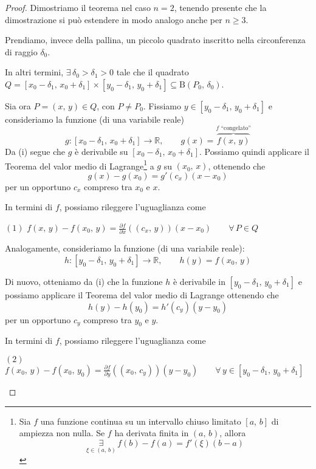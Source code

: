\begin{proof}
Dimostriamo il teorema nel caso $n=2$, tenendo presente che la dimostrazione si può estendere in modo analogo anche per $n \geq 3$.

Prendiamo, invece della pallina, un piccolo quadrato inscritto nella circonferenza di raggio $\delta_0$.
\begin{center}
\def\svgwidth{14cm}

\end{center}
In altri termini, $\exists \, \delta_0 > \delta_1 > 0$ tale che il quadrato $Q=[x_0-\delta_1,\,x_0+\delta_1] \times [y_0-\delta_1,\,y_0+\delta_1] \subseteq \mathrm{B}(P_0,\,\delta_0)$.

Sia ora $P=(x,\,y) \in Q$, con $P \neq P_0$. Fissiamo $y \in [y_0-\delta_1,\,y_0+\delta_1]$ e consideriamo la funzione (di una variabile reale)
$$g:[x_0-\delta_1,\,x_0+\delta_1] \rightarrow \mathbb{R}, \qquad g(x) = \overbrace{f(x,\,y)}^{f \text{ ``congelato''}}$$
Da (i) segue che $g$ è derivabile su $[x_0-\delta_1,\,x_0+\delta_1]$. Possiamo quindi applicare il Teorema del valor medio di Lagrange\footnote{
\cite{Greco2012} Sia $f$ una funzione continua su un intervallo chiuso limitato $[a,\,b]$ di ampiezza non nulla. Se $f$ ha derivata finita in $(a,\,b)$, allora
$$
\underset{{\xi \in (a,\,b)}}{\exists} \, f(b)-f(a) = f'(\xi)(b-a)
$$
} a $g$ su $(x_0,\,x)$, ottenendo che
$$g(x)-g(x_0) = g'(c_x)(x-x_0)$$
per un opportuno $c_x$ compreso tra $x_0$ e $x$.

In termini di $f$, possiamo rileggere l'uguaglianza come
	\begin{center}
	$\mathrm{(1)}$
	\hfill
	$\displaystyle f(x,\,y) - f(x_0,\,y) = \frac{\partial f}{\partial x}((c_x,\,y))(x-x_0) \qquad \forall \, P \in Q$\hfill\null
	\end{center}

Analogamente, consideriamo la funzione (di una variabile reale):
$$h:[y_0-\delta_1,\,y_0+\delta_1] \rightarrow \mathbb{R}, \qquad h(y) = f(x_0,\,y)$$

Di nuovo, otteniamo da (i) che la funzione $h$ è derivabile in $[y_0-\delta_1,\,y_0+\delta_1]$ e possiamo applicare il Teorema del valor medio di Lagrange ottenendo che
$$h(y)-h(y_0) = h'(c_y)(y-y_0)$$
per un opportuno $c_y$ compreso tra $y_0$ e $y$.

In termini di $f$, possiamo rileggere l'uguaglianza come
	\begin{center}
	$\mathrm{(2)}$
	\hfill
	$\displaystyle f(x_0,\,y) - f(x_0,\,y_0) = \frac{\partial f}{\partial y}((x_0,\,c_y))(y-y_0) \qquad \forall \, y \in [y_0-\delta_1,\,y_0+\delta_1]$\hfill\null
	\end{center}


\end{proof}
